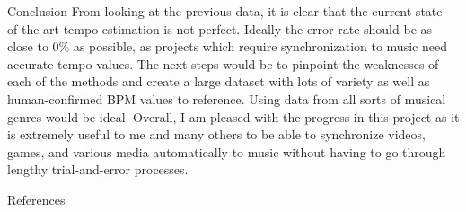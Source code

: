 \documentclass[xcolor={table,xdraw}]{beamer}       %
\begin{document}
\begin{frame}
\begin{columns}
\begin{column}{0.33\textwidth}
\begin{block}{Conclusion}
        From looking at the previous data, it is clear that the current
        state-of-the-art tempo estimation is not perfect. Ideally the error rate
        should be as close to 0\% as possible, as projects which require
        synchronization to music need accurate tempo values. The next steps
        would be to pinpoint the weaknesses of each of the methods and create a
        large dataset with lots of variety as well as human-confirmed BPM values
        to reference. Using data from all sorts of musical genres would be
        ideal. Overall, I am pleased with the progress in this project as it is
        extremely useful to me and many others to be able to synchronize videos,
        games, and various media automatically to music without having to go
        through lengthy trial-and-error processes.
      \end{block}

      \begin{block}{References}
        \printbibliography  
      \end{block}

    \end{column}

  \end{columns}
\end{frame}
\end{document}
